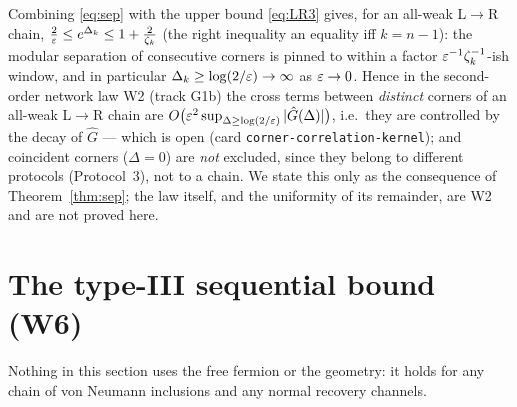 \documentclass[11pt]{article}
\theoremstyle{definition}\newtheorem{example}[theorem]{Example}
\begin{document}
\begin{remark}\label{rem:sep-meaning}
Combining \eqref{eq:sep} with the upper bound \eqref{eq:LR3} gives, for an all-weak L$\to$R chain,
$\frac2{\varepsilon}\le e^{\Delta_k}\le1+\frac2{\zeta_k}$ (the right inequality an equality iff $k=n-1$):
the modular separation of consecutive corners is
pinned to within a factor $\varepsilon^{-1}\zeta_k^{-1}$-ish window, and in particular
$\Delta_k\ge\log(2/\varepsilon)\to\infty$ as $\varepsilon\to0$.  Hence in the second-order network law W2
(track G1b) the cross terms between \emph{distinct} corners of an all-weak L$\to$R chain are
$O\bigl(\varepsilon^2\sup_{\Delta\ge\log(2/\varepsilon)}|\hat G(\Delta)|\bigr)$, i.e.\ they are controlled by
the decay of $\hat G$ --- which is open (card \texttt{corner-correlation-kernel}); and coincident
corners ($\Delta=0$) are \emph{not} excluded, since they belong to different protocols
(Protocol~3), not to a chain.  We state this only as the consequence of
Theorem~\ref{thm:sep}; the law itself, and the uniformity of its remainder, are W2 and are not
proved here.
\end{remark}

\section{The type-III sequential bound (W6)}\label{sec:w6}

Nothing in this section uses the free fermion or the geometry: it holds for any chain of von
Neumann inclusions and any normal recovery channels.
\end{document}
